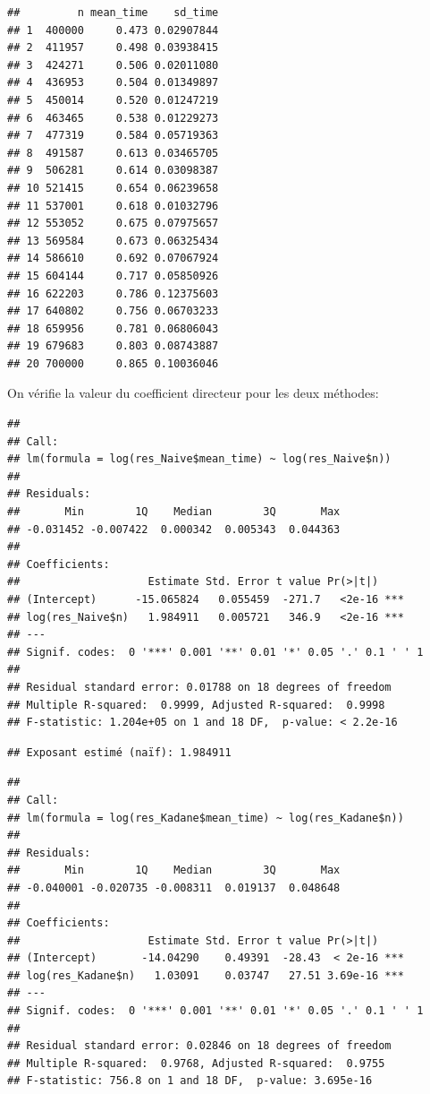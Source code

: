 \documentclass[
]{article}
\begin{document}
\begin{verbatim}
##         n mean_time    sd_time
## 1  400000     0.473 0.02907844
## 2  411957     0.498 0.03938415
## 3  424271     0.506 0.02011080
## 4  436953     0.504 0.01349897
## 5  450014     0.520 0.01247219
## 6  463465     0.538 0.01229273
## 7  477319     0.584 0.05719363
## 8  491587     0.613 0.03465705
## 9  506281     0.614 0.03098387
## 10 521415     0.654 0.06239658
## 11 537001     0.618 0.01032796
## 12 553052     0.675 0.07975657
## 13 569584     0.673 0.06325434
## 14 586610     0.692 0.07067924
## 15 604144     0.717 0.05850926
## 16 622203     0.786 0.12375603
## 17 640802     0.756 0.06703233
## 18 659956     0.781 0.06806043
## 19 679683     0.803 0.08743887
## 20 700000     0.865 0.10036046
\end{verbatim}

On vérifie la valeur du coefficient directeur pour les deux méthodes:

\begin{verbatim}
## 
## Call:
## lm(formula = log(res_Naive$mean_time) ~ log(res_Naive$n))
## 
## Residuals:
##       Min        1Q    Median        3Q       Max 
## -0.031452 -0.007422  0.000342  0.005343  0.044363 
## 
## Coefficients:
##                    Estimate Std. Error t value Pr(>|t|)    
## (Intercept)      -15.065824   0.055459  -271.7   <2e-16 ***
## log(res_Naive$n)   1.984911   0.005721   346.9   <2e-16 ***
## ---
## Signif. codes:  0 '***' 0.001 '**' 0.01 '*' 0.05 '.' 0.1 ' ' 1
## 
## Residual standard error: 0.01788 on 18 degrees of freedom
## Multiple R-squared:  0.9999, Adjusted R-squared:  0.9998 
## F-statistic: 1.204e+05 on 1 and 18 DF,  p-value: < 2.2e-16
\end{verbatim}

\begin{verbatim}
## Exposant estimé (naïf): 1.984911
\end{verbatim}

\begin{verbatim}
## 
## Call:
## lm(formula = log(res_Kadane$mean_time) ~ log(res_Kadane$n))
## 
## Residuals:
##       Min        1Q    Median        3Q       Max 
## -0.040001 -0.020735 -0.008311  0.019137  0.048648 
## 
## Coefficients:
##                    Estimate Std. Error t value Pr(>|t|)    
## (Intercept)       -14.04290    0.49391  -28.43  < 2e-16 ***
## log(res_Kadane$n)   1.03091    0.03747   27.51 3.69e-16 ***
## ---
## Signif. codes:  0 '***' 0.001 '**' 0.01 '*' 0.05 '.' 0.1 ' ' 1
## 
## Residual standard error: 0.02846 on 18 degrees of freedom
## Multiple R-squared:  0.9768, Adjusted R-squared:  0.9755 
## F-statistic: 756.8 on 1 and 18 DF,  p-value: 3.695e-16
\end{verbatim}
\end{document}

